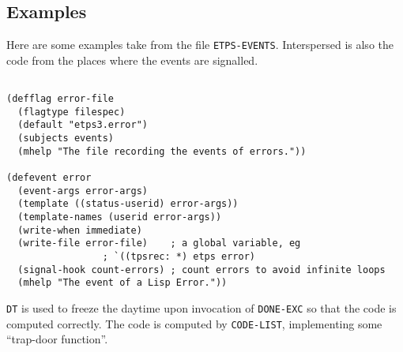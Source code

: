 \subsection{Examples}

Here are some examples take from the file {\tt ETPS-EVENTS}.  Interspersed
is also the code from the places where the events are signalled.

\begin{verbatim}

(defflag error-file
  (flagtype filespec)
  (default "etps3.error")
  (subjects events)
  (mhelp "The file recording the events of errors."))

(defevent error
  (event-args error-args)
  (template ((status-userid) error-args))
  (template-names (userid error-args))
  (write-when immediate)
  (write-file error-file)    ; a global variable, eg
			     ; `((tpsrec: *) etps error)
  (signal-hook count-errors) ; count errors to avoid infinite loops
  (mhelp "The event of a Lisp Error."))
\end{verbatim}
{\tt DT} is used to freeze the daytime upon invocation of {\tt DONE-EXC} so that
the code is computed correctly.  The code is computed by {\tt CODE-LIST},
implementing some ``trap-door function''.

